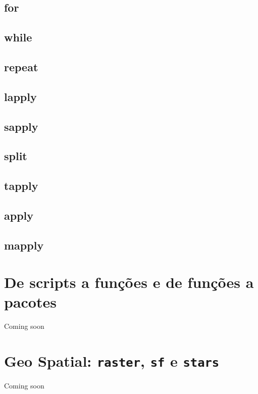 \documentclass[]{book}
\begin{document}
\section{for}\label{for}

\section{while}\label{while}

\section{repeat}\label{repeat}

\section{lapply}\label{lapply}

\section{sapply}\label{sapply}

\section{split}\label{split}

\section{tapply}\label{tapply}

\section{apply}\label{apply}

\section{mapply}\label{mapply}

\chapter{De scripts a funções e de funções a pacotes}\label{fx}

Coming soon

\chapter{\texorpdfstring{Geo Spatial: \texttt{raster}, \texttt{sf} e
\texttt{stars}}{Geo Spatial: raster, sf e stars}}\label{geo}

Coming soon


\end{document}
